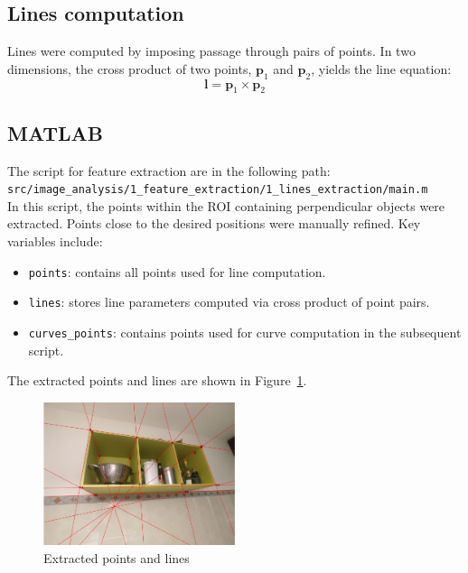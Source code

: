 \documentclass{Academic}
\begin{document}
\subsection{Lines computation}
Lines were computed by imposing passage through pairs of points. In two dimensions, the cross product of two points, $\mathbf{p}_1$ and $\mathbf{p}_2$, yields the line equation:
\begin{equation}\mathbf{l}=\mathbf{p}_1 \times \mathbf{p}_2\end{equation}

\subsection*{MATLAB}
The script for feature extraction are in the following path: \\ 
\texttt{src/image\_analysis/1\_feature\_extraction/1\_lines\_extraction/main.m} \\
In this script, the points within the ROI containing perpendicular objects were extracted. 
Points close to the desired positions were manually refined. 
Key variables include:
\begin{itemize}
    \item \texttt{points}: contains all points used for line computation.
    \item \texttt{lines}: stores line parameters computed via cross product of point pairs.
    \item \texttt{curves\_points}: contains points used for curve computation in the subsequent script.
\end{itemize}
The extracted points and lines are shown in Figure~\ref{fig:ext_lines}.
\begin{figure}[!htb]%
    \centering
    \includegraphics[width=0.5\textwidth]{images/ext_lines.jpg}
    \caption{Extracted points and lines}
    \label{fig:ext_lines}
\end{figure}
\end{document}
